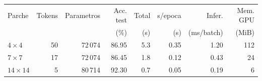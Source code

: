 \begin{tabular}{lrrrrrrr}
\toprule
Parche & Tokens & Parametros & Acc. test & Total & s/epoca & Infer. & Mem. GPU \\
 & & & (\%) & (s) & (s) & (ms/batch) & (MiB) \\
\midrule
$4\times4$ & 50 & 72\,074 & 86.95 & 5.3 & 0.35 & 1.20 & 112 \\
$7\times7$ & 17 & 72\,074 & 86.45 & 1.8 & 0.12 & 0.43 & 24 \\
$14\times14$ & 5 & 80\,714 & 92.30 & 0.7 & 0.05 & 0.19 & 6 \\
\bottomrule
\end{tabular}
